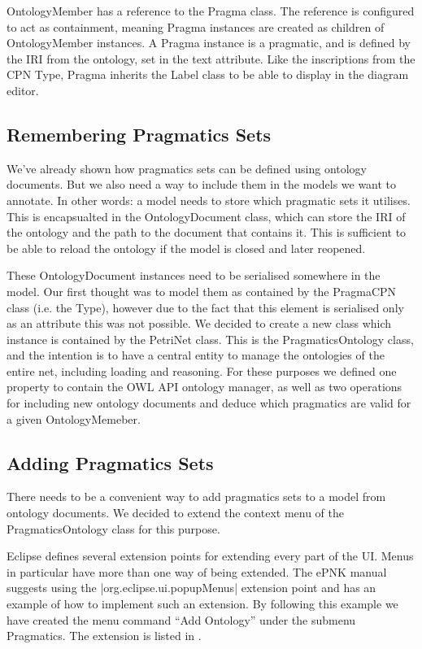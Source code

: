 OntologyMember has a reference to the Pragma class. The reference is
configured to act as containment, meaning Pragma instances are created as
children of OntologyMember instances. A Pragma instance is a pragmatic, and is
defined by the IRI from the ontology, set in the text attribute. Like the
inscriptions from the CPN Type, Pragma inherits the Label class to be able to
display in the diagram editor.

\subsection{Remembering Pragmatics Sets}
We've already shown how pragmatics sets can be defined using ontology documents.
But we also need a way to include them in the models we want to annotate.
In other words: a model needs to store which pragmatic sets it utilises. This is
encapsualted in the OntologyDocument class, which can store the IRI of the
ontology and the path to the document that contains it. This is sufficient to be
able to reload the ontology if the model is closed and later reopened.

These OntologyDocument instances need to be serialised somewhere in the model.
Our first thought was to model them as contained by the PragmaCPN class (i.e.
the Type), however due to the fact that this element is serialised only as an
attribute this was not possible. We decided to create a new class which instance
is contained by the PetriNet class. This is the PragmaticsOntology class, and
the intention is to have a central entity to manage the ontologies of the entire
net, including loading and reasoning. For these purposes we defined one property
to contain the OWL API ontology manager, as well as two operations for including
new ontology documents and deduce which pragmatics are valid for a given
OntologyMemeber.

\subsection{Adding Pragmatics Sets}\label{sec:menufirsttime}
There needs to be a convenient way to add pragmatics sets to a model from
ontology documents. We decided to extend the context menu of the
PragmaticsOntology class for this purpose. 

Eclipse defines several extension points for extending every part of the UI.
Menus in particular have more than one way of being extended. The ePNK manual
suggests using the |org.eclipse.ui.popupMenus| extension point and has an
example of how to implement such an extension. By following this example we have
created the menu command ``Add Ontology'' under the submenu Pragmatics. The
extension is listed in . 

